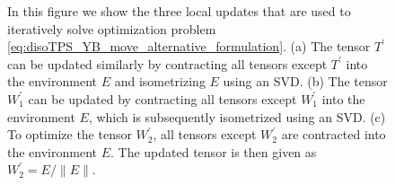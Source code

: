 \begin{figure}
\begin{subfigure}[c]{0.85\textwidth}
		\caption{}\label{fig:YB_move_iterate_polar_optimize_W2}
	\end{subfigure}%
	\caption{In this figure we show the three local updates that are used to iteratively solve optimization problem \eqref{eq:disoTPS_YB_move_alternative_formulation}. (a) The tensor $T^\prime$ can be updated similarly by contracting all tensors except $T^\prime$ into the environment $E$ and isometrizing $E$ using an SVD. (b) The tensor $W_1^\prime$ can be updated by contracting all tensors except $W_1^\prime$ into the environment $E$, which is subsequently isometrized using an SVD. (c) To optimize the tensor $W_2^\prime$, all tensors except $W_2^\prime$ are contracted into the environment $E$. The updated tensor is then given as $W_2^\prime = E/\lVert E\rVert$.}
	\label{fig:YB_move_iterate_polar}
\end{figure}